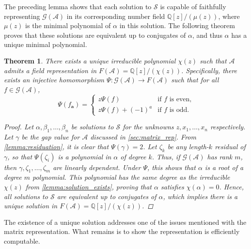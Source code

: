 \documentclass[12pt, letterpaper]{article}
\newcommand{\Q}{\mathbb Q}
\newcommand{\A}{\mathcal A}
\newcommand{\ch}[1]{\mathbf{#1}}
\newcommand{\res}[2]{{{#1}_{\ch{#2}}}}
\renewcommand{\S}{\mathcal S}
\newcommand{\gp}{\mathcal G}
\newtheorem{thm}{Theorem}[section]
\begin{document}
The preceding lemma shows that each solution to $\S$ is capable of faithfully
representing $\gp(\A)$ in its corresponding number field
$\Q[z] / (\mu(z))$, where $\mu(z)$ is the minimal polynomial of $\alpha$
in this solution.  The following theorem proves that these solutions are
equivalent up to conjugates of $\alpha$, and thus $\alpha$ has a unique
minimal polynomial.

\begin{thm}\label{thm:field_representation_unique}
    There exists a unique irreducible polynomial $\chi(z)$ such that $\A$
    admits a field representation in $F(\A) = \Q[z] / (\chi(z))$.
    Specifically, there exists an injective homomorphism $\Psi: \gp(\A)
    \rightarrow F(\A)$ such that for all $f \in \gp(\A)$,
    \begin{equation} \label{eq:zresiduals}
        \Psi(\res{f}{a}) = \begin{cases}
            z \Psi(f) & \text{if $f$ is even,}\\
            z \Psi(f) + (-1)^a & \text{if $f$ is odd.}
        \end{cases}
    \end{equation}
    \begin{proof}
        Let $\alpha, \beta_1, \ldots, \beta_n$ be solutions to $\S$ for the
        unknowns $z, x_1, \ldots, x_n$ respectively. Let $\gamma$ be the gap
        value for $\A$ discussed in \cref{sec:matrix_rep}.  From
        \cref{lemma:residuation}, it is clear that $\Psi(\gamma) = 2$. Let
        $\zeta_k$ be any length-$k$ residual of $\gamma$, so that
        $\Psi(\zeta_i)$ is a polynomial in $\alpha$ of degree $k$. Thus, if
        $\gp(\A)$ has rank $m$, then $\gamma, \zeta_1, \ldots, \zeta_{m}$ are
        linearly dependent. Under $\Psi$, this shows that $\alpha$ is a root of
        a degree $m$ polynomial. This polynomial has the same degree as the
        irreducible $\chi(z)$ from \cref{lemma:solution_exists}, proving that
        $\alpha$ satisfies $\chi(\alpha) = 0$. Hence, all solutions to $\S$ are
        equivalent up to conjugates of $\alpha$, which implies there is a
        unique solution in $F(\A) = \Q[z] / (\chi(z))$.
    \end{proof}
\end{thm}

The existence of a unique solution addresses one of the issues mentioned with
the matrix representation. What remains is to show the representation is
efficiently computable.
\end{document}
